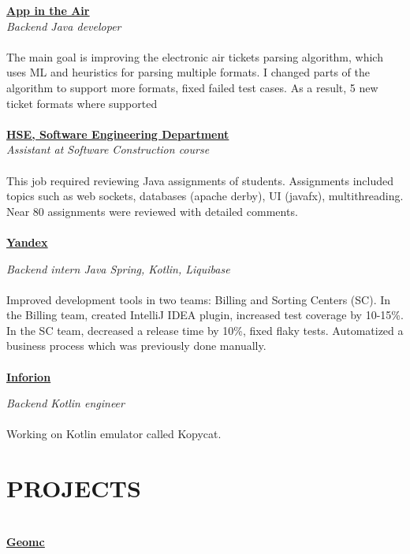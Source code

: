\documentclass{article}
\begin{document}
\noindent\href{https://www.appintheair.mobi/}{{\textbf{\underline{App in the Air}}}}
\\\noindent\textit{Backend Java developer}
\\\\
\noindent The main goal is improving the electronic air tickets parsing algorithm, which uses ML and heuristics
for parsing multiple formats. I changed parts of the algorithm to support more formats, fixed failed test
cases. As a result, 5 new ticket formats where supported
\\\\
\noindent\href{https://cs.hse.ru/en/dse/}{{\textbf{\underline{HSE, Software Engineering Department}}}}
\\\textit{Assistant at Software Construction course}
\\\\
\noindent  This job required reviewing Java assignments of students. Assignments included topics such as web sockets,
databases (apache derby), UI (javafx), multithreading. Near 80 assignments were reviewed with detailed
comments.
\\\\
\noindent\href{https://yandex.com/}{{\textbf{\underline{Yandex}}}}

\noindent \textit{Backend intern Java Spring, Kotlin, Liquibase}
\\\\
\noindent Improved development tools in two teams: Billing and Sorting Centers (SC). In the Billing team, created
IntelliJ IDEA plugin, increased test coverage by 10-15\%. In the SC team, decreased a release time by
10\%, fixed flaky tests. Automatized a business process which was previously done manually.
\\\\
\noindent\href{https://inforion.ru/}{{\textbf{\underline{Inforion}}}}

\noindent \textit{Backend Kotlin engineer}
\\\\
\noindent Working on Kotlin emulator called Kopycat.


\section*{PROJECTS}
\makebox[530pt]{\rule{570pt}{0.4pt}}\\
\noindent\href{https://45.156.25.18/}{{\textbf{\underline{Geomc}}}}
\end{document}
